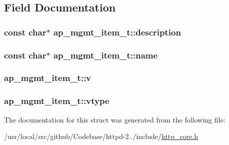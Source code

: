 \subsection{Field Documentation}
\subsubsection[{\texorpdfstring{description}{description}}]{\setlength{\rightskip}{0pt plus 5cm}const char$\ast$ ap\+\_\+mgmt\+\_\+item\+\_\+t\+::description}\hypertarget{structap__mgmt__item__t_a298008bcfb6ee60a252fbb4f916fa4cc}{}\label{structap__mgmt__item__t_a298008bcfb6ee60a252fbb4f916fa4cc}
\subsubsection[{\texorpdfstring{name}{name}}]{\setlength{\rightskip}{0pt plus 5cm}const char$\ast$ ap\+\_\+mgmt\+\_\+item\+\_\+t\+::name}\hypertarget{structap__mgmt__item__t_ad6ebf778be5cfaf43afe5bfd62182c81}{}\label{structap__mgmt__item__t_ad6ebf778be5cfaf43afe5bfd62182c81}
\subsubsection[{\texorpdfstring{v}{v}}]{ ap\+\_\+mgmt\+\_\+item\+\_\+t\+::v}\hypertarget{structap__mgmt__item__t_a2a4c07aba533200ed529d57e8e7d69d7}{}\label{structap__mgmt__item__t_a2a4c07aba533200ed529d57e8e7d69d7}
\subsubsection[{\texorpdfstring{vtype}{vtype}}]{ ap\+\_\+mgmt\+\_\+item\+\_\+t\+::vtype}\hypertarget{structap__mgmt__item__t_a760264518b956dc378e2a197cd3e283f}{}\label{structap__mgmt__item__t_a760264518b956dc378e2a197cd3e283f}


The documentation for this struct was generated from the following file\+:\begin{DoxyCompactItemize}
\item 
/usr/local/src/github/\+Codebase/httpd-\/2../include/\hyperlink{http__core_8h}{http\+\_\+core.\+h}\end{DoxyCompactItemize}
